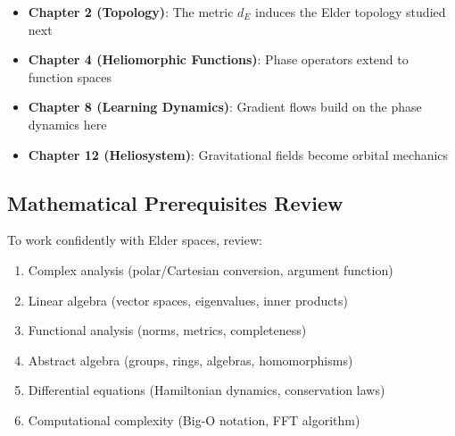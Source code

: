 \documentclass[12pt,a4paper]{article}
\theoremstyle{definition}
\theoremstyle{remark}
\begin{document}
\begin{itemize}
\item \textbf{Chapter 2 (Topology)}: The metric $d_E$ induces the Elder topology studied next
\item \textbf{Chapter 4 (Heliomorphic Functions)}: Phase operators extend to function spaces
\item \textbf{Chapter 8 (Learning Dynamics)}: Gradient flows build on the phase dynamics here
\item \textbf{Chapter 12 (Heliosystem)}: Gravitational fields become orbital mechanics
\end{itemize}

\subsection{Mathematical Prerequisites Review}

To work confidently with Elder spaces, review:
\begin{enumerate}
\item Complex analysis (polar/Cartesian conversion, argument function)
\item Linear algebra (vector spaces, eigenvalues, inner products)
\item Functional analysis (norms, metrics, completeness)
\item Abstract algebra (groups, rings, algebras, homomorphisms)
\item Differential equations (Hamiltonian dynamics, conservation laws)
\item Computational complexity (Big-O notation, FFT algorithm)
\end{enumerate}
\end{document}

